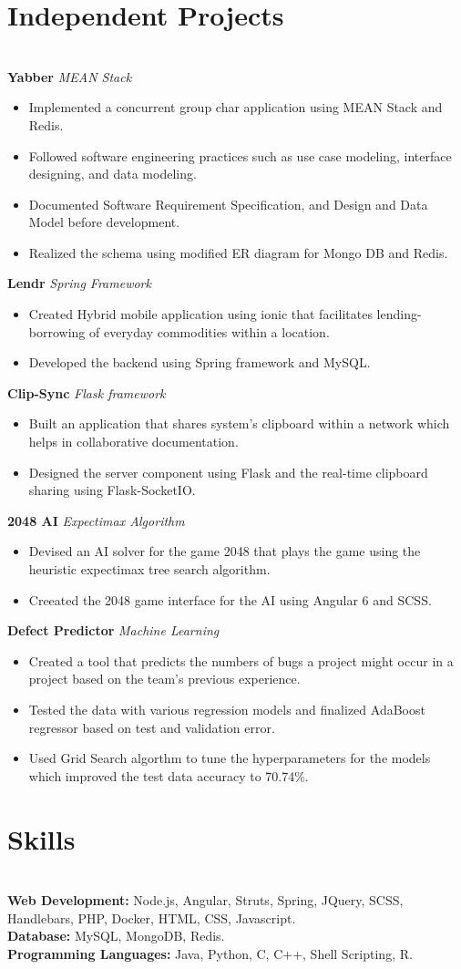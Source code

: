\documentclass{resume}
\begin{document}
\section*{Independent Projects}
\titlerule
\noindent
\\
\textbf{Yabber} \hfill \textit{MEAN Stack}
\begin{itemize}
  \item Implemented a concurrent group char application using MEAN Stack and Redis.
  \item Followed software engineering practices such as use case modeling, interface designing, and data modeling.
  \item Documented Software Requirement Specification, and Design and Data Model before development.
  \item Realized the schema using modified ER diagram for Mongo DB and Redis.
\end{itemize}
\textbf{Lendr} \hfill \textit{Spring Framework}
\begin{itemize}
  \item Created Hybrid mobile application using ionic that facilitates lending-borrowing of everyday commodities within a location.
  \item Developed the backend using Spring framework and MySQL.
\end{itemize}
\textbf{Clip-Sync} \hfill \textit{Flask framework}
\begin{itemize}
  \item Built an application that shares system's clipboard within a network which helps in collaborative documentation. 
  \item Designed the server component using Flask and the real-time clipboard sharing using Flask-SocketIO.
\end{itemize}
\textbf{2048 AI} \hfill \textit{Expectimax Algorithm}
\begin{itemize}
  \item Devised an AI solver for the game 2048 that plays the game using the heuristic expectimax tree search algorithm.
  \item Creeated the 2048 game interface for the AI using Angular 6 and SCSS.
\end{itemize}
\textbf{Defect Predictor} \hfill \textit{Machine Learning}
\begin{itemize}
  \item Created a tool that predicts the numbers of bugs a project might occur in a project based on the team's previous experience.
  \item Tested the data with various regression models and finalized AdaBoost regressor based on test and validation error.
  \item Used Grid Search algorthm to tune the hyperparameters for the models which improved the test data accuracy to 70.74\%.
\end{itemize}
\section*{Skills}
\titlerule
\noindent
\\
\textbf{Web Development:} Node.js, Angular, Struts, Spring, JQuery, SCSS, Handlebars, PHP, Docker, HTML, CSS, Javascript. \\
\textbf{Database:} MySQL, MongoDB, Redis. \\
\textbf{Programming Languages:} Java, Python, C, C++, Shell Scripting, R.\\
\end{document}
